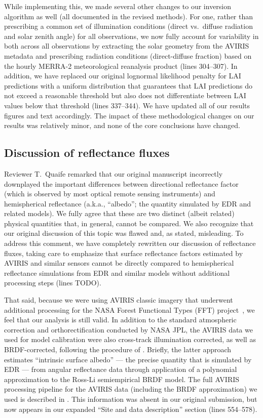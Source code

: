 \documentclass{article}
\begin{document}
While implementing this, we made several other changes to our inversion algorithm as well (all documented in the revised methods).
For one, rather than prescribing a common set of illumination conditions (direct vs.\ diffuse radiation and solar zenith angle) for all observations,
we now fully account for variability in both across all observations by extracting the solar geometry from the AVIRIS metadata and
prescribing radiation conditions (direct-diffuse fraction) based on the hourly MERRA-2 meteorological reanalysis product (lines 304--307).
In addition, we have replaced our original lognormal likelihood penalty for LAI predictions with a uniform distribution that guarantees that LAI predictions do not exceed a reasonable threshold but also does not differentiate between LAI values below that threshold (lines 337--344).
We have updated all of our results figures and text accordingly.
The impact of these methodological changes on our results was relatively minor, and none of the core conclusions have changed.

\subsection{Discussion of reflectance fluxes}\label{subsec:brdf}

Reviewer T.\ Quaife remarked that our original manuscript incorrectly downplayed the important differences between directional reflectance factor (which is observed by most optical remote sensing instruments) and hemispherical reflectance (a.k.a., ``albedo''; the quantity simulated by EDR and related models).
We fully agree that these are two distinct (albeit related) physical quantities that, in general, cannot be compared.
We also recognize that our original discussion of this topic was flawed and, as stated, misleading.
To address this comment, we have completely rewritten our discussion of reflectance fluxes, taking care to emphasize that surface reflectance factors estimated by AVIRIS and similar sensors cannot be directly compared to hemispherical reflectance simulations from EDR and similar models without additional processing steps (lines TODO).

That said, because we were using AVIRIS classic imagery that underwent additional processing for the NASA Forest Functional Types (FFT) project~\citep{singh2015imaging}, we feel that our analysis is still valid.
In addition to the standard atmospheric correction and orthorectification conducted by NASA JPL, the AVIRIS data we used for model calibration were also cross-track illumination corrected, as well as BRDF-corrected, following the procedure of \citet{lucht2000algorithm}.
Briefly, the latter approach estimates “intrinsic surface albedo” --- the precise quantity that is simulated by EDR --- from angular reflectance data through application of a polynomial approximation to the Ross-Li semiempirical BRDF model.
The full AVIRIS processing pipeline for the  AVIRIS data (including the BRDF approximation) we used is described in \citet{singh2015imaging}.
This information was absent in our original submission, but now appears in our expanded ``Site and data description'' section (lines 554--578).
\end{document}
